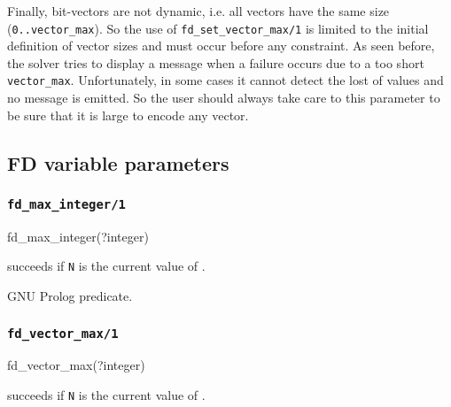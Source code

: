 Finally, bit-vectors are not dynamic, i.e. all vectors have the same size
(\texttt{0..vector\_max}). So the use of \texttt{fd\_set\_vector\_max/1} is
limited to the initial definition of vector sizes and must occur before any
constraint. As seen before, the solver tries to display a message when a
failure occurs due to a too short \texttt{vector\_max}. Unfortunately, in
some cases it cannot detect the lost of values and no message is emitted. So
the user should always take care to this parameter to be sure that it is
large to encode any vector.

\subsection{FD variable parameters}

\subsubsection{\texttt{fd\_max\_integer/1}}
\label{fd-max-integer/1}

\begin{TemplatesOneCol}
fd\_max\_integer(?integer)

\end{TemplatesOneCol}

\Description

 succeeds if \texttt{N} is the current value of
 .

\begin{PlErrors}


\end{PlErrors}

\Portability

GNU Prolog predicate.

\subsubsection{\texttt{fd\_vector\_max/1}}

\begin{TemplatesOneCol}
fd\_vector\_max(?integer)

\end{TemplatesOneCol}

\Description

 succeeds if \texttt{N} is the current value of
 .

